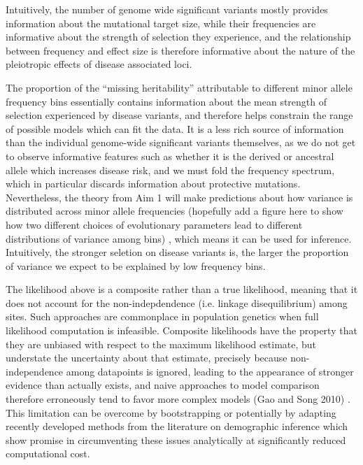 \documentclass[11pt]{article}
\newcommand{\jb}[1]{{\color{blue} (#1)} }
\begin{document}
Intuitively, the number of genome wide significant variants mostly provides information about the mutational target size, while their frequencies are informative about the strength of selection they experience, and the relationship between frequency and effect size is therefore informative about the nature of the pleiotropic effects of disease associated loci.

The proportion of the ``missing heritability'' attributable to different minor allele frequency bins essentially contains information about the mean strength of selection experienced by disease variants, and therefore helps constrain the range of possible models which can fit the data. It is a less rich source of information than the individual genome-wide significant variants themselves, as we do not get to observe informative features such as whether it is the derived or ancestral allele which increases disease risk, and we must fold the frequency spectrum, which in particular discards information about protective mutations\cite{Bustamante:2001wi}. Nevertheless, the theory from Aim 1 will make predictions about how variance is distributed across minor allele frequencies \jb{hopefully add a figure here to show how two different choices of evolutionary parameters lead to different distributions of variance among bins}, which means it can be used for inference. Intuitively, the stronger seletion on disease variants is, the larger the proportion of variance we expect to be explained by low frequency bins.


The likelihood above is a composite rather than a true likelihood, meaning that it does not account for the non-indepdendence (i.e. linkage disequilibrium) among sites. Such approaches are commonplace in population genetics when full likelihood computation is infeasible. Composite likelihoods have the property that they are unbiased with respect to the maximum likelihood estimate, but understate the uncertainty about that estimate, precisely because non-independence among datapoints is ignored, leading to the appearance of stronger evidence than actually exists, and naive approaches to model comparison therefore erroneously tend to favor more complex models \jb{Gao and Song 2010}. This limitation can be overcome by bootstrapping or potentially by adapting recently developed methods from the literature on demographic inference which show promise in circumventing these issues analytically at significantly reduced computational cost. 
\end{document}
